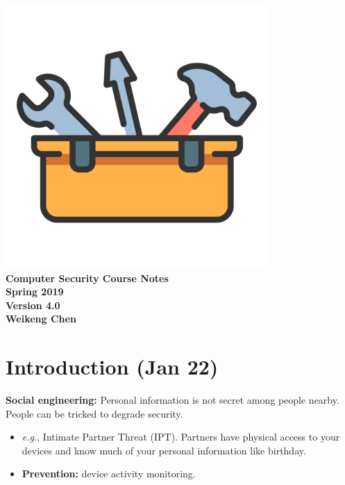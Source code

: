 \documentclass{article}
\newcommand{\parhead}[1]{\noindent \textbf{#1}}
\begin{document}
\begin{titlepage}
    \centering
    \vfill
    \includegraphics[width=0.75\textwidth]{toolbox_repair.pdf}\\
    \vspace{0.2em}
    {\bfseries\huge
        Computer Security Course Notes\\
        Spring 2019\\[0.2em]
        {\Large Version 4.0}\\
        \vskip2cm
        Weikeng Chen\\
    }    
    \vfill
\end{titlepage}



\section{Introduction (Jan 22)}

\parhead{Social engineering:} Personal information is not secret among people nearby. People can be tricked to degrade security.
\begin{itemize}
    \item \emph{e.g.}, Intimate Partner Threat (IPT). Partners have physical access to your devices and know much of your personal information like birthday.
    
    \item \textbf{Prevention:} device activity monitoring.
\end{itemize}
\end{document}

